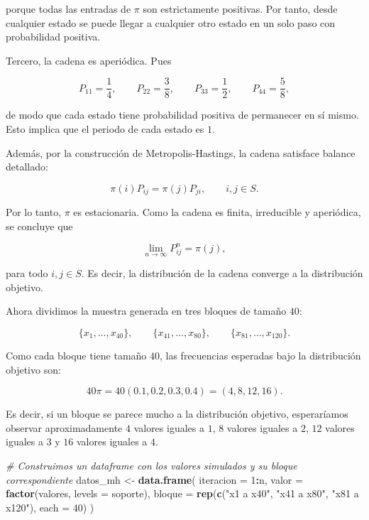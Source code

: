 \documentclass[
]{article}
\newenvironment{Shaded}{\begin{snugshade}}{\end{snugshade}}
\newcommand{\AttributeTok}[1]{\textcolor[rgb]{0.13,0.29,0.53}{#1}}
\newcommand{\CommentTok}[1]{\textcolor[rgb]{0.56,0.35,0.01}{\textit{#1}}}
\newcommand{\DecValTok}[1]{\textcolor[rgb]{0.00,0.00,0.81}{#1}}
\newcommand{\FunctionTok}[1]{\textcolor[rgb]{0.13,0.29,0.53}{\textbf{#1}}}
\newcommand{\NormalTok}[1]{#1}
\newcommand{\OtherTok}[1]{\textcolor[rgb]{0.56,0.35,0.01}{#1}}
\newcommand{\SpecialCharTok}[1]{\textcolor[rgb]{0.81,0.36,0.00}{\textbf{#1}}}
\newcommand{\StringTok}[1]{\textcolor[rgb]{0.31,0.60,0.02}{#1}}
\begin{document}
porque todas las entradas de \(\pi\) son estrictamente positivas. Por
tanto, desde cualquier estado se puede llegar a cualquier otro estado en
un solo paso con probabilidad positiva.

Tercero, la cadena es aperiódica. Pues

\[
P_{11}=\frac14,\qquad P_{22}=\frac38,\qquad P_{33}=\frac12,\qquad P_{44}=\frac58,
\]

de modo que cada estado tiene probabilidad positiva de permanecer en sí
mismo. Esto implica que el periodo de cada estado es \(1\).

Además, por la construcción de Metropolis-Hastings, la cadena satisface
balance detallado:

\[
\pi(i)P_{ij}=\pi(j)P_{ji}, \qquad i,j\in S.
\]

Por lo tanto, \(\pi\) es estacionaria. Como la cadena es finita,
irreducible y aperiódica, se concluye que

\[
\lim_{n\to\infty}P^n_{ij}=\pi(j),
\]

para todo \(i,j\in S\). Es decir, la distribución de la cadena converge
a la distribución objetivo.

Ahora dividimos la muestra generada en tres bloques de tamaño \(40\):

\[
\{x_1,\ldots,x_{40}\}, \qquad \{x_{41},\ldots,x_{80}\}, \qquad \{x_{81},\ldots,x_{120}\}.
\]

Como cada bloque tiene tamaño \(40\), las frecuencias esperadas bajo la
distribución objetivo son:

\[
40\pi = 40(0.1,0.2,0.3,0.4)=(4,8,12,16).
\]

Es decir, si un bloque se parece mucho a la distribución objetivo,
esperaríamos observar aproximadamente \(4\) valores iguales a \(1\),
\(8\) valores iguales a \(2\), \(12\) valores iguales a \(3\) y \(16\)
valores iguales a \(4\).

\begin{Shaded}
\begin{Highlighting}[]
\CommentTok{\# Construimos un dataframe con los valores simulados y su bloque correspondiente}
\NormalTok{datos\_mh }\OtherTok{\textless{}{-}} \FunctionTok{data.frame}\NormalTok{(}
  \AttributeTok{iteracion =} \DecValTok{1}\SpecialCharTok{:}\NormalTok{n,}
  \AttributeTok{valor =} \FunctionTok{factor}\NormalTok{(valores, }\AttributeTok{levels =}\NormalTok{ soporte),}
  \AttributeTok{bloque =} \FunctionTok{rep}\NormalTok{(}\FunctionTok{c}\NormalTok{(}\StringTok{"x1 a x40"}\NormalTok{, }\StringTok{"x41 a x80"}\NormalTok{, }\StringTok{"x81 a x120"}\NormalTok{), }\AttributeTok{each =} \DecValTok{40}\NormalTok{)}
\NormalTok{)}
\end{Highlighting}
\end{Shaded}
\end{document}
